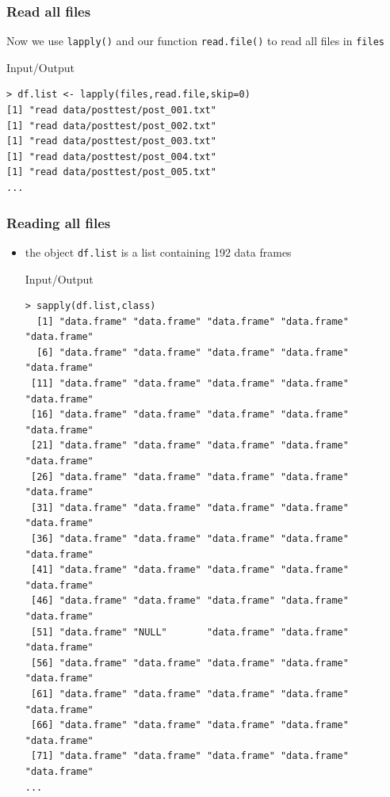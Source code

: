 \documentclass[xcolor={table},c]{beamer}
\begin{document}
\begin{frame}[fragile]\frametitle{Read all files}
Now we use \texttt{lapply()} and our function \texttt{read.file()} to read all files in \texttt{files}
  \begin{exampleblock}{Input/Output}\footnotesize
\begin{verbatim}
> df.list <- lapply(files,read.file,skip=0)
[1] "read data/posttest/post_001.txt"
[1] "read data/posttest/post_002.txt"
[1] "read data/posttest/post_003.txt"
[1] "read data/posttest/post_004.txt"
[1] "read data/posttest/post_005.txt"
...
\end{verbatim}
  \end{exampleblock}
\end{frame}


\begin{frame}[fragile]\frametitle{Reading all files}
  \begin{itemize}
  \item the object \texttt{df.list} is a list containing 192 data frames
    \begin{exampleblock}{Input/Output}\tiny
\begin{verbatim}
> sapply(df.list,class)
  [1] "data.frame" "data.frame" "data.frame" "data.frame" "data.frame"
  [6] "data.frame" "data.frame" "data.frame" "data.frame" "data.frame"
 [11] "data.frame" "data.frame" "data.frame" "data.frame" "data.frame"
 [16] "data.frame" "data.frame" "data.frame" "data.frame" "data.frame"
 [21] "data.frame" "data.frame" "data.frame" "data.frame" "data.frame"
 [26] "data.frame" "data.frame" "data.frame" "data.frame" "data.frame"
 [31] "data.frame" "data.frame" "data.frame" "data.frame" "data.frame"
 [36] "data.frame" "data.frame" "data.frame" "data.frame" "data.frame"
 [41] "data.frame" "data.frame" "data.frame" "data.frame" "data.frame"
 [46] "data.frame" "data.frame" "data.frame" "data.frame" "data.frame"
 [51] "data.frame" "NULL"       "data.frame" "data.frame" "data.frame"
 [56] "data.frame" "data.frame" "data.frame" "data.frame" "data.frame"
 [61] "data.frame" "data.frame" "data.frame" "data.frame" "data.frame"
 [66] "data.frame" "data.frame" "data.frame" "data.frame" "data.frame"
 [71] "data.frame" "data.frame" "data.frame" "data.frame" "data.frame"
...
\end{verbatim}
    \end{exampleblock}
  \end{itemize}
\end{frame}
\end{document}

